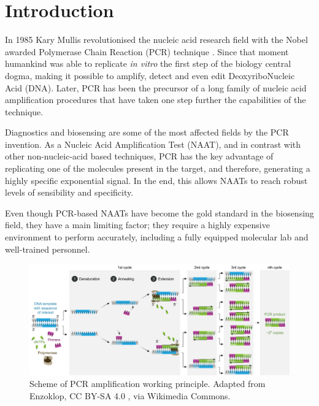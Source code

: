
\chapter{Introduction}

In 1985 Kary Mullis revolutionised the nucleic acid research field with the Nobel awarded Polymerase Chain Reaction (PCR) technique \cite{saiki_enzymatic_1985}. Since that moment humankind was able to replicate \emph{in vitro} the first step of the biology central dogma, making it possible to amplify, detect and even edit DeoxyriboNucleic Acid (DNA). Later, PCR has been the precursor of a long family of nucleic acid amplification procedures that have taken one step further the capabilities of the technique.

Diagnostics and biosensing are some of the most affected fields by the PCR invention. As a Nucleic Acid Amplification Test (NAAT), and in contrast with other non-nucleic-acid based techniques, PCR has the key advantage of replicating one of the molecules present in the target, and therefore, generating a highly specific exponential signal. In the end, this allows NAATs to reach robust levels of sensibility and specificity. 

Even though PCR-based NAATs have become the gold standard in the biosensing field\cite{oliveira_isothermal_2021}, they have a main limiting factor; they require a highly expensive environment to perform accurately, including a fully equipped molecular lab and well-trained personnel. 
\linebreak
\linebreak

\begin{figure}[b]
    \centering
    \includegraphics[width=1\textwidth]{figures/PCR.png}
    \caption{Scheme of PCR amplification working principle. Adapted from Enzoklop, CC BY-SA 4.0 , via Wikimedia Commons.}
    \label{fig:PCR}
\end{figure}


